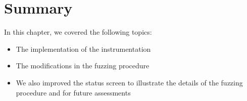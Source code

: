 \section{Summary}

In this chapter, we covered the following topics:

\begin{itemize}
    \item The implementation of the instrumentation
    \item The modifications in the fuzzing procedure
    \item We also improved the status screen to illustrate the details of the fuzzing procedure and for future assessments
\end{itemize}